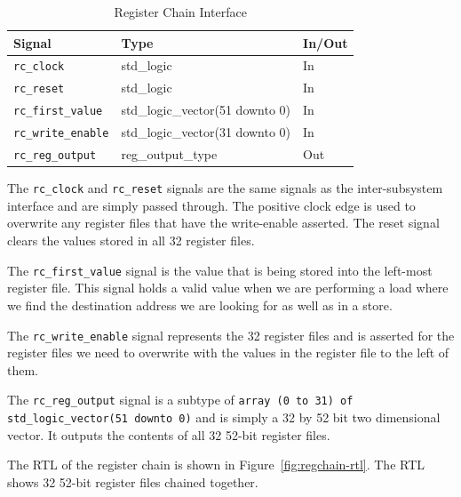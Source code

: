 \documentclass{article}
\begin{document}
\begin{table}[ht]
    \begin{center}
        \begin{tabular}{lll}\hline
        Signal & Type & In/Out \\
        \hline
        \texttt{rc\_clock} & std\_logic & In \\
        \hline
        \texttt{rc\_reset} & std\_logic & In \\
        \hline
        \texttt{rc\_first\_value} & std\_logic\_vector(51 downto 0) & In \\
        \hline
        \texttt{rc\_write\_enable} & std\_logic\_vector(31 downto 0) & In \\
        \hline
        \texttt{rc\_reg\_output} & reg\_output\_type & Out \\
        \hline
        \end{tabular}
        \caption{Register Chain Interface}\label{tab:reg}
    \end{center}
\end{table}

The \texttt{rc\_clock} and \texttt{rc\_reset} signals are the same signals as the inter-subsystem interface and are simply passed through. The positive clock edge is used to overwrite any register files that have the write-enable asserted. The reset signal clears the values stored in all 32 register files.

The \texttt{rc\_first\_value} signal is the value that is being stored into the left-most register file. This signal holds a valid value when we are performing a load where we find the destination address we are looking for as well as in a store. 

The \texttt{rc\_write\_enable} signal represents the 32 register files and is asserted for the register files we need to overwrite with the values in the register file to the left of them. 

The \texttt{rc\_reg\_output} signal is a subtype of \texttt{array (0 to 31) of std\_logic\_vector(51 downto 0)} and is simply a 32 by 52 bit two dimensional vector. It outputs the contents of all 32 52-bit register files.

The RTL of the register chain is shown in Figure~\ref{fig:regchain-rtl}. The RTL shows 32 52-bit register files chained together.
\end{document}

